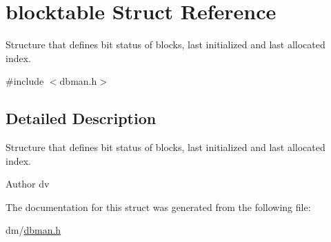 \hypertarget{structblocktable}{}\section{blocktable Struct Reference}
\label{structblocktable}


Structure that defines bit status of blocks, last initialized and last allocated index.  




{\ttfamily \#include $<$dbman.\+h$>$}



\subsection{Detailed Description}
Structure that defines bit status of blocks, last initialized and last allocated index. 

\begin{DoxyAuthor}{Author}
dv 
\end{DoxyAuthor}


The documentation for this struct was generated from the following file\+:\begin{DoxyCompactItemize}
\item 
dm/\hyperlink{dbman_8h}{dbman.\+h}\end{DoxyCompactItemize}

